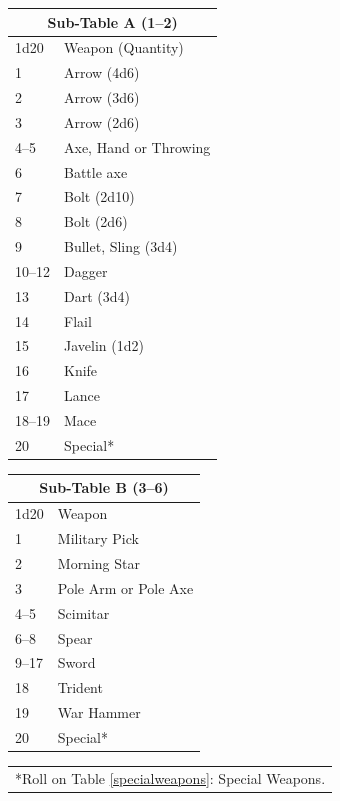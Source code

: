 \begin{multicols}{2}
\begin{minipage}{\columnwidth}
\label{weapontype}
\noindent \begin{tabular}{|p{}|p{}|}
\multicolumn{2}{c}{Sub-Table A (1--2)} \\
\hline
1d20	& Weapon (Quantity) \\
\hline\hline
\rowcolor[gray]{.9}1	& Arrow (4d6) \\
2	& Arrow (3d6) \\
\rowcolor[gray]{.9}3	& Arrow (2d6) \\
4--5	& Axe, Hand or Throwing \\
\rowcolor[gray]{.9}6	& Battle axe \\
7	& Bolt (2d10) \\
\rowcolor[gray]{.9}8	& Bolt (2d6) \\
9	& Bullet, Sling (3d4) \\
\rowcolor[gray]{.9}10--12	& Dagger \\
13	& Dart (3d4) \\
\rowcolor[gray]{.9}14	& Flail \\
15	& Javelin (1d2) \\
\rowcolor[gray]{.9}16	& Knife \\
17	& Lance \\
\rowcolor[gray]{.9}18--19	& Mace \\
20	& Special* \\
\hline
\end{tabular}

\end{minipage}

\noindent \begin{tabular}{|p{}|p{}|}
\multicolumn{2}{c}{Sub-Table B (3--6)} \\
\hline
1d20	& Weapon \\
\hline\hline
\rowcolor[gray]{.9}1	& Military Pick \\
2	& Morning Star \\
\rowcolor[gray]{.9}3	& Pole Arm or Pole Axe \\
4--5	& Scimitar \\
\rowcolor[gray]{.9}6--8	& Spear \\
9--17	& Sword \\
\rowcolor[gray]{.9}18	& Trident \\
19	& War Hammer \\
\rowcolor[gray]{.9}20	& Special* \\
\hline
\end{tabular}
\noindent\begin{tabular}{p{}}
*Roll on Table \ref{specialweapons}: Special Weapons. \\
\end{tabular}\vspace{.5em}
 

\end{multicols}
